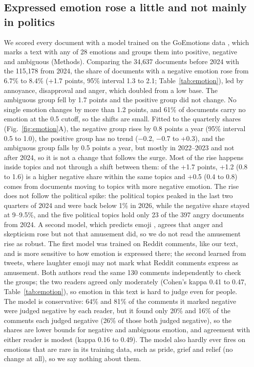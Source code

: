 \subsection*{Expressed emotion rose a little and not mainly in politics}
We scored every document with a model trained on the GoEmotions data \cite{demszky2020goemotions}, which marks a text with any of 28 emotions and groups them into positive, negative and ambiguous (Methods). Comparing the 34{,}637 documents before 2024 with the 115{,}178 from 2024, the share of documents with a negative emotion rose from 6.7\% to 8.4\% (+1.7 points, 95\% interval 1.3 to 2.1; Table~\ref{tab:emotion}), led by annoyance, disapproval and anger, which doubled from a low base. The ambiguous group fell by 1.7 points and the positive group did not change. No single emotion changes by more than 1.2 points, and 61\% of documents carry no emotion at the 0.5 cutoff, so the shifts are small. Fitted to the quarterly shares (Fig.~\ref{fig:emotion}A), the negative group rises by 0.8 points a year (95\% interval 0.5 to 1.0), the positive group has no trend ($-$0.2, $-$0.7 to +0.3), and the ambiguous group falls by 0.5 points a year, but mostly in 2022--2023 and not after 2024, so it is not a change that follows the surge. Most of the rise happens inside topics and not through a shift between them: of the +1.7 points, +1.2 (0.8 to 1.6) is a higher negative share within the same topics and +0.5 (0.4 to 0.8) comes from documents moving to topics with more negative emotion. The rise does not follow the political spike: the political topics peaked in the last two quarters of 2024 and were back below 1\% in 2026, while the negative share stayed at 9--9.5\%, and the five political topics hold only 23 of the 397 angry documents from 2024. A second model, which predicts emoji \cite{felbo2017deepmoji}, agrees that anger and skepticism rose but not that amusement did, so we do not read the amusement rise as robust. The first model was trained on Reddit comments, like our text, and is more sensitive to how emotion is expressed there; the second learned from tweets, where laughter emoji may not mark what Reddit comments express as amusement. Both authors read the same 130 comments independently to check the groups; the two readers agreed only moderately (Cohen's kappa \cite{cohen1960kappa} 0.41 to 0.47, Table~\ref{tab:emotion}), so emotion in this text is hard to judge even for people. The model is conservative: 64\% and 81\% of the comments it marked negative were judged negative by each reader, but it found only 20\% and 16\% of the comments each judged negative (26\% of those both judged negative), so the shares are lower bounds for negative and ambiguous emotion, and agreement with either reader is modest (kappa 0.16 to 0.49). The model also hardly ever fires on emotions that are rare in its training data, such as pride, grief and relief (no change at all), so we say nothing about them.

